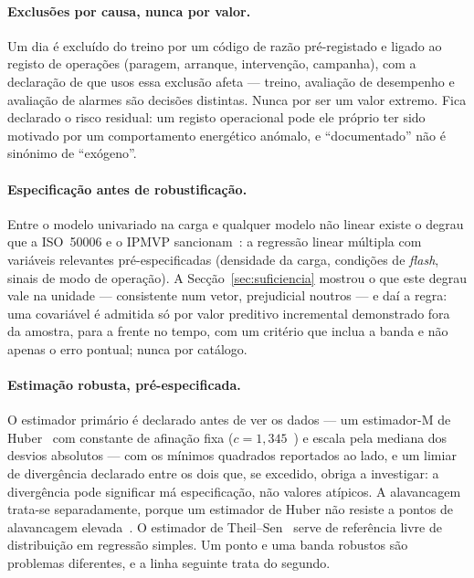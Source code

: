 \paragraph{Exclusões por causa, nunca por valor.} Um dia é excluído do treino
por um código de razão pré-registado e ligado ao registo de operações
(paragem, arranque, intervenção, campanha), com a declaração de que usos
essa exclusão afeta --- treino, avaliação de desempenho e avaliação de
alarmes são decisões distintas. Nunca por ser um valor extremo. Fica
declarado o risco residual: um registo operacional pode ele próprio ter sido
motivado por um comportamento energético anómalo, e ``documentado'' não é
sinónimo de ``exógeno''.

\paragraph{Especificação antes de robustificação.} Entre o modelo univariado
na carga e qualquer modelo não linear existe o degrau que a ISO~50006 e o
IPMVP sancionam~\cite{ISO50006_2014,IPMVP_2022}: a regressão linear múltipla com variáveis relevantes
pré-especificadas (densidade da carga, condições de \emph{flash}, sinais de
modo de operação). A Secção~\ref{sec:suficiencia} mostrou o que este degrau
vale na unidade --- consistente num vetor, prejudicial noutros --- e daí a
regra: uma covariável é admitida só por valor preditivo incremental
demonstrado fora da amostra, para a frente no tempo, com um critério que
inclua a banda e não apenas o erro pontual; nunca por catálogo.

\paragraph{Estimação robusta, pré-especificada.} O estimador primário é
declarado antes de ver os dados --- um estimador-M de Huber~\cite{Huber1964,HuberRonchetti2009} com constante
de afinação fixa ($c = 1{,}345$~\cite{HollandWelsch1977}) e escala pela
mediana dos desvios absolutos  ---
com os mínimos quadrados reportados ao lado, e um limiar de divergência
declarado entre os dois que, se excedido, obriga a investigar: a divergência
pode significar má especificação, não valores atípicos. A alavancagem
trata-se separadamente, porque um estimador de Huber não resiste a pontos de
alavancagem elevada~\cite{RousseeuwLeroy1987}. O estimador de Theil--Sen~\cite{Sen1968}
 serve de referência livre de
distribuição em regressão simples. Um ponto e uma banda robustos são
problemas diferentes, e a linha seguinte trata do segundo.

